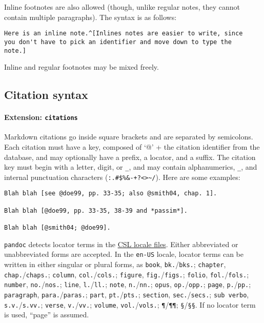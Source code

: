 \documentclass[]{article}
\begin{document}
Inline footnotes are also allowed (though, unlike regular notes, they
cannot contain multiple paragraphs). The syntax is as follows:

\begin{verbatim}
Here is an inline note.^[Inlines notes are easier to write, since
you don't have to pick an identifier and move down to type the
note.]
\end{verbatim}

Inline and regular footnotes may be mixed freely.

\hypertarget{citation-syntax}{%
\subsection{Citation syntax}\label{citation-syntax}}

\hypertarget{extension-citations}{%
\paragraph{\texorpdfstring{Extension:
\texttt{citations}}{Extension: citations}}\label{extension-citations}}

Markdown citations go inside square brackets and are separated by
semicolons. Each citation must have a key, composed of `@' + the
citation identifier from the database, and may optionally have a prefix,
a locator, and a suffix. The citation key must begin with a letter,
digit, or \texttt{\_}, and may contain alphanumerics, \texttt{\_}, and
internal punctuation characters
(\texttt{:.\#\$\%\&-+?\textless{}\textgreater{}\textasciitilde{}/}).
Here are some examples:

\begin{verbatim}
Blah blah [see @doe99, pp. 33-35; also @smith04, chap. 1].

Blah blah [@doe99, pp. 33-35, 38-39 and *passim*].

Blah blah [@smith04; @doe99].
\end{verbatim}

\texttt{pandoc} detects locator terms in the
\href{https://github.com/citation-style-language/locales}{CSL locale
files}. Either abbreviated or unabbreviated forms are accepted. In the
\texttt{en-US} locale, locator terms can be written in either singular
or plural forms, as \texttt{book}, \texttt{bk.}/\texttt{bks.};
\texttt{chapter}, \texttt{chap.}/\texttt{chaps.}; \texttt{column},
\texttt{col.}/\texttt{cols.}; \texttt{figure},
\texttt{fig.}/\texttt{figs.}; \texttt{folio},
\texttt{fol.}/\texttt{fols.}; \texttt{number},
\texttt{no.}/\texttt{nos.}; \texttt{line}, \texttt{l.}/\texttt{ll.};
\texttt{note}, \texttt{n.}/\texttt{nn.}; \texttt{opus},
\texttt{op.}/\texttt{opp.}; \texttt{page}, \texttt{p.}/\texttt{pp.};
\texttt{paragraph}, \texttt{para.}/\texttt{paras.}; \texttt{part},
\texttt{pt.}/\texttt{pts.}; \texttt{section},
\texttt{sec.}/\texttt{secs.}; \texttt{sub\ verbo},
\texttt{s.v.}/\texttt{s.vv.}; \texttt{verse}, \texttt{v.}/\texttt{vv.};
\texttt{volume}, \texttt{vol.}/\texttt{vols.}; \texttt{¶}/\texttt{¶¶};
\texttt{§}/\texttt{§§}. If no locator term is used, ``page'' is assumed.
\end{document}
